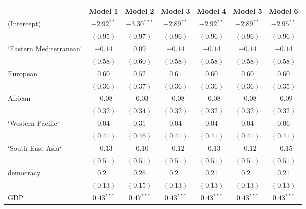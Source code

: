 
\begin{table}[!h]
\begin{center}
\begin{tabular}{l c c c c c c }
\toprule
 & Model 1 & Model 2 & Model 3 & Model 4 & Model 5 & Model 6 \\
\midrule
(Intercept)             & $-2.92^{**}$ & $-3.30^{***}$ & $-2.89^{**}$ & $-2.92^{**}$ & $-2.89^{**}$ & $-2.95^{**}$ \\
                        & $(0.95)$     & $(0.97)$      & $(0.96)$     & $(0.96)$     & $(0.96)$     & $(0.96)$     \\
`Eastern Mediterranean` & $-0.14$      & $0.09$        & $-0.14$      & $-0.14$      & $-0.14$      & $-0.14$      \\
                        & $(0.58)$     & $(0.60)$      & $(0.58)$     & $(0.58)$     & $(0.58)$     & $(0.58)$     \\
European                & $0.60$       & $0.52$        & $0.61$       & $0.60$       & $0.60$       & $0.60$       \\
                        & $(0.36)$     & $(0.37)$      & $(0.36)$     & $(0.36)$     & $(0.36)$     & $(0.35)$     \\
African                 & $-0.08$      & $-0.03$       & $-0.08$      & $-0.08$      & $-0.08$      & $-0.09$      \\
                        & $(0.32)$     & $(0.34)$      & $(0.32)$     & $(0.32)$     & $(0.32)$     & $(0.32)$     \\
`Western Pacific`       & $0.04$       & $0.31$        & $0.04$       & $0.04$       & $0.04$       & $0.06$       \\
                        & $(0.41)$     & $(0.46)$      & $(0.41)$     & $(0.41)$     & $(0.41)$     & $(0.41)$     \\
`South-East Asia`       & $-0.13$      & $-0.10$       & $-0.12$      & $-0.13$      & $-0.12$      & $-0.15$      \\
                        & $(0.51)$     & $(0.51)$      & $(0.51)$     & $(0.51)$     & $(0.51)$     & $(0.51)$     \\
democracy               & $0.21$       & $0.26$        & $0.21$       & $0.21$       & $0.21$       & $0.21$       \\
                        & $(0.13)$     & $(0.15)$      & $(0.13)$     & $(0.13)$     & $(0.13)$     & $(0.13)$     \\
GDP                     & $0.43^{***}$ & $0.47^{***}$  & $0.43^{***}$ & $0.43^{***}$ & $0.43^{***}$ & $0.43^{***}$ \\

\end{tabular}
\end{center}
\end{table}
